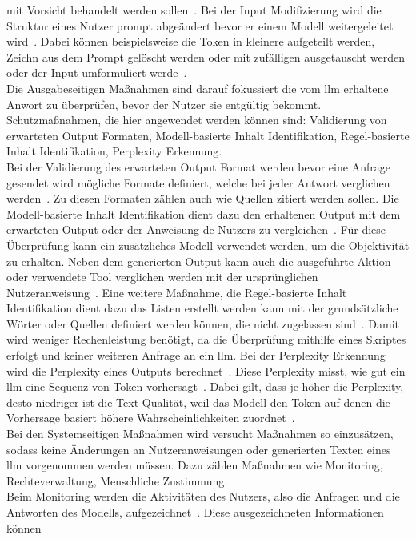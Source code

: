 mit Vorsicht behandelt werden sollen~\cite[9]{sm10}. Bei der Input Modifizierung wird die Struktur eines Nutzer prompt abgeändert bevor er einem Modell weitergeleitet wird~\cite[9]{sm10}.
Dabei können beispielsweise die Token in kleinere aufgeteilt werden, Zeichn aus dem Prompt gelöscht werden oder mit zufälligen ausgetauscht werden oder der Input umformuliert
werde~\cite[6]{sm11}. \\
Die Ausgabeseitigen Maßnahmen sind darauf fokussiert die vom \ac{llm} erhaltene Anwort zu überprüfen, bevor der Nutzer sie entgültig bekommt. Schutzmaßnahmen, die hier 
angewendet werden können sind: Validierung von erwarteten Output Formaten, Modell-basierte Inhalt Identifikation, Regel-basierte Inhalt Identifikation, Perplexity Erkennung. \\
Bei der Validierung des erwarteten Output Format werden bevor eine Anfrage gesendet wird mögliche Formate definiert, welche bei jeder Antwort verglichen werden~\cite{pi15}. Zu 
diesen
Formaten zählen auch wie Quellen zitiert werden sollen. Die Modell-basierte Inhalt Identifikation dient dazu den erhaltenen Output mit dem erwarteten Output oder der Anweisung 
de Nutzers zu 
vergleichen~\cite[55]{pi1}. Für diese Überprüfung kann ein zusätzliches Modell verwendet werden, um die Objektivität zu erhalten. Neben dem generierten Output kann auch die 
ausgeführte Aktion oder verwendete Tool verglichen werden mit der ursprünglichen Nutzeranweisung~\cite[7]{sm09}. Eine weitere Maßnahme, die Regel-basierte Inhalt Identifikation
dient dazu das Listen erstellt werden kann mit der grundsätzliche Wörter oder Quellen definiert werden können, die nicht zugelassen sind~\cite[55]{pi1}. Damit wird weniger
Rechenleistung benötigt, da die Überprüfung mithilfe eines Skriptes erfolgt und keiner weiteren Anfrage an ein \ac{llm}. Bei der Perplexity Erkennung wird die Perplexity 
eines Outputs berechnet~\cite[6]{sm11}. Diese Perplexity misst, wie gut ein \ac{llm} eine Sequenz von Token vorhersagt~\cite{sm13}. Dabei gilt, dass je höher die Perplexity, 
desto niedriger ist die Text Qualität, weil das Modell den Token auf denen die Vorhersage basiert höhere Wahrscheinlichkeiten zuordnet~\cite{sm13}. \\
Bei den Systemseitigen Maßnahmen wird versucht Maßnahmen so einzusätzen, sodass keine Änderungen an Nutzeranweisungen oder generierten Texten eines \ac{llm} vorgenommen werden 
müssen. Dazu zählen Maßnahmen wie Monitoring, Rechteverwaltung, Menschliche Zustimmung. \\
Beim Monitoring werden die Aktivitäten des Nutzers, also die Anfragen und die Antworten des Modells, aufgezeichnet~\cite{sm04}. Diese ausgezeichneten Informationen können
